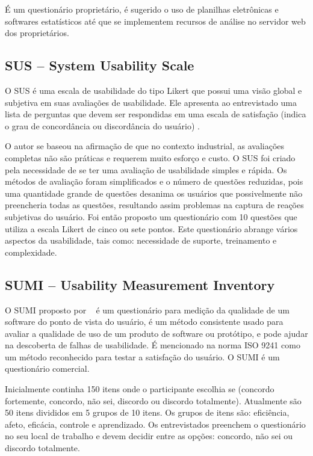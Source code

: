 	É um questionário proprietário, é sugerido o uso de planilhas eletrônicas e softwares estatísticos até que se implementem recursos de análise no servidor web dos proprietários.

\subsection{SUS – System Usability Scale}

	O SUS é uma escala de usabilidade do tipo Likert que possui uma visão global e subjetiva em suas avaliações de usabilidade. Ele apresenta ao entrevistado uma lista de perguntas que devem ser respondidas em uma escala de satisfação (indica o grau de concordância ou discordância do usuário) \cite{brooke1996sus}.

	O autor se baseou na afirmação de que no contexto industrial, as avaliações completas não são práticas e requerem muito esforço e custo. O SUS foi criado pela necessidade de se ter uma avaliação de usabilidade simples e rápida. Os métodos de avaliação foram simplificados e o número de questões reduzidas, pois uma quantidade grande de questões desanima os usuários que possivelmente não preencheria todas as questões, resultando assim problemas na captura de reações subjetivas do usuário. Foi então proposto um questionário com 10 questões que utiliza a escala Likert de cinco ou sete pontos. Este questionário abrange vários aspectos da usabilidade, tais como: necessidade de suporte, treinamento e complexidade. ~\cite{preece2007}

\subsection{SUMI – Usability Measurement Inventory}

	O SUMI proposto por ~ é um questionário para medição da qualidade de um software do ponto de vista do usuário, é um método consistente usado para avaliar a qualidade de uso de um produto de software ou protótipo, e pode ajudar na descoberta de falhas de usabilidade. É mencionado na norma ISO 9241 como um método reconhecido para testar a satisfação do usuário. O SUMI é um questionário comercial. 

	Inicialmente continha 150 itens onde o participante escolhia se (concordo fortemente, concordo, não sei, discordo ou discordo totalmente). Atualmente são 50 itens divididos em 5 grupos de 10 itens. Os grupos de itens são: eficiência, afeto, eficácia, controle e aprendizado. Os entrevistados preenchem o questionário no seu local de trabalho e devem decidir entre as opções: concordo, não sei ou discordo totalmente.


